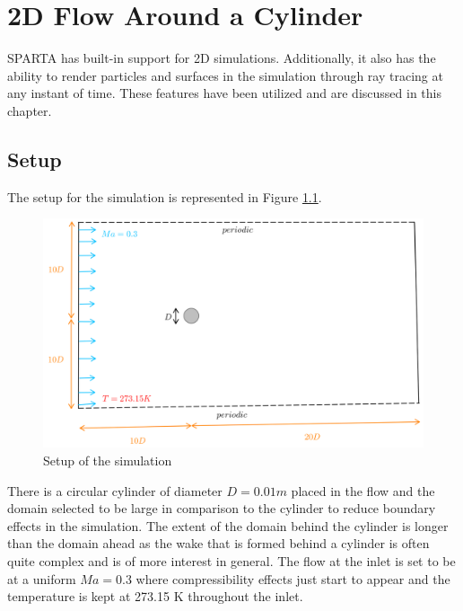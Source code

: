 \newpage

\chapter{2D Flow Around a Cylinder}

SPARTA has built-in support for 2D simulations. Additionally, it also has the ability to render particles and surfaces in the simulation through ray tracing at any instant of time. These features have been utilized and are discussed in this chapter.

\section{Setup}

The setup for the simulation is represented in Figure \ref{img:flow}.

\begin{figure}[H]
  \includegraphics[scale=0.3]{Pictures/Chapter_6_2D_Flow/Flow.png}
  \centering
  \caption{Setup of the simulation}
  \label{img:flow}
\end{figure}

\no There is a circular cylinder of diameter $D = 0.01 m$ placed in the flow and the domain selected to be large in comparison to the cylinder to reduce boundary effects in the simulation. The extent of the domain behind the cylinder is longer than the domain ahead as the wake that is formed behind a cylinder is often quite complex and is of more interest in general. The flow at the inlet is set to be at a uniform $Ma = 0.3$ where compressibility effects just start to appear and the temperature is kept at 273.15 K throughout the inlet. \\

